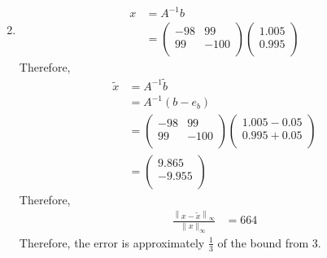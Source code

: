 \documentclass[fleqn, a4paper, 11pt, oneside]{amsart}
\theoremstyle{definition}
\theoremstyle{theorem}
\begin{document}
\begin{solution}
\begin{enumerate}[leftmargin=*]
\begin{align*}
			\end{align*}
		\item
			\begin{align*}
				x &= A^{-1} b\\
				&=
					\begin{pmatrix}
						-98 & 99   \\
						99  & -100 \\
					\end{pmatrix}
					\begin{pmatrix}
						1.005 \\
						0.995 \\
					\end{pmatrix}
			\end{align*}
			Therefore,
			\begin{align*}
				\tilde{x} &= A^{-1} \tilde{b}\\
				&= A^{-1} (b - e_b)\\
				&=
					\begin{pmatrix}
						-98 & 99   \\
						99  & -100 \\
					\end{pmatrix}
					\begin{pmatrix}
						1.005 - 0.05 \\
						0.995 + 0.05 \\
					\end{pmatrix}\\
				&=
					\begin{pmatrix}
						9.865  \\
						-9.955 \\
					\end{pmatrix}
			\end{align*}
			Therefore,
			\begin{align*}
				\frac{\left\| x - \tilde{x} \right\|_{\infty}}{\|x\|_{\infty}} & = 664
			\end{align*}
			Therefore, the error is approximately $\frac{1}{3}$ of the bound from 3.
	\end{enumerate}
\end{solution}
\end{document}
